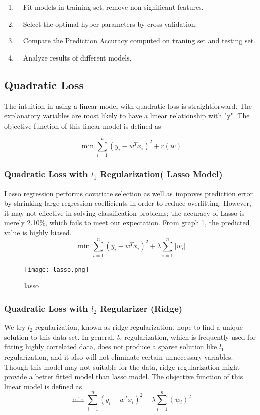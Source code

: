 \documentclass{mytemplate}%
\begin{document}
\begin{multicols}{2}
\begin{enumerate}
  \item ~~Fit models in training set, remove non-significant features.
  \item ~~Select the optimal hyper-parameters by cross validation.
  \item ~~Compare the Prediction Accuracy computed on traning set and testing set.
  \item ~~Analyze results of different models.
\end{enumerate}
\subsection{Quadratic Loss}
The intuition in using a linear model with quadratic
loss is straightforward. The explanatory variables are most likely to have a linear relationship with "y". The objective function of this linear model is defined as 

\begin{equation}
\min \sum_{i=1}^n(y_i-w^Tx_i)^2+r(w)
\end{equation}
\subsubsection{Quadratic Loss with $l_1$ Regularization( Lasso Model)}
Lasso regression performs covariate selection as well as improves prediction error by shrinking large regression coefficients in order to reduce overfitting. However, it may not effective in solving classification problems; the accuracy of Lasso is merely 2.10\%, which fails to meet our expectation. From {\color{red} graph \ref{g05}}, the predicted value is highly biased. 
\begin{equation}\label{eq01}
  \min \sum_{i=1}^n(y_i-w^Tx_i)^2+\lambda\sum_{i=1}^n|w_i|
\end{equation}

\begin{figure}[H]
  \centering
  \texttt{[image: lasso.png]}\\
  \caption{lasso}\label{g05}
\end{figure}

\subsubsection{Quadratic Loss with $l_2$ Regularizer (Ridge)}
We try $l_2$ regularization, known as ridge regularization,
hope to find a unique solution to this data set. In
general, $l_2$ regularization, which is frequently used for fitting highly correlated data, does not produce a sparse solution like $l_1$ regularization, and it also will not eliminate certain unnecessary variables. Though this model may not suitable for the data, ridge regularization might provide a better fitted model than lasso model.
The objective function of this linear model is defined as 
\begin{equation}\label{eq02}
  \min \sum_{i=1}^n(y_i-w^Tx_i)^2+\lambda\sum_{i=1}^n(w_i)^2
\end{equation}

\end{multicols}
\end{document}
